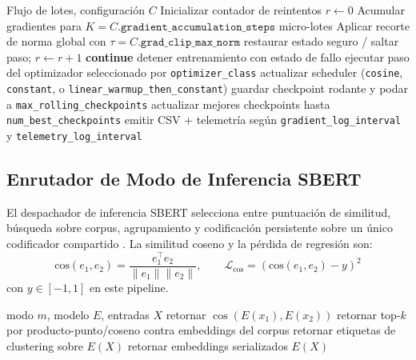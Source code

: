 \begin{algorithm}[t]
\caption{Paso de Entrenamiento Guiado por Esquema con Controles de Estabilidad}
\begin{algorithmic}[1]
\Require Flujo de lotes, configuración $C$
\State Inicializar contador de reintentos $r\gets 0$
    \State Acumular gradientes para $K=C.\texttt{gradient\_accumulation\_steps}$ micro-lotes
    \State Aplicar recorte de norma global con $\tau=C.\texttt{grad\_clip\_max\_norm}$
            \State restaurar estado seguro / saltar paso; $r \gets r+1$
            \State \textbf{continue}
        \Else
            \State detener entrenamiento con estado de fallo
        \EndIf
    \EndIf
    \State ejecutar paso del optimizador seleccionado por \texttt{optimizer\_class}
    \State actualizar scheduler (\texttt{cosine}, \texttt{constant}, o \texttt{linear\_warmup\_then\_constant})
        \State guardar checkpoint rodante y podar a \texttt{max\_rolling\_checkpoints}
    \EndIf
    \State actualizar mejores checkpoints hasta \texttt{num\_best\_checkpoints}
    \State emitir CSV + telemetría según \texttt{gradient\_log\_interval} y \texttt{telemetry\_log\_interval}
\EndFor
\end{algorithmic}
\end{algorithm}

\subsection{Enrutador de Modo de Inferencia SBERT}

El despachador de inferencia SBERT selecciona entre puntuación de similitud, búsqueda sobre corpus, agrupamiento y codificación persistente sobre un único codificador compartido \citep{reimers_sentence-bert_2019}. La similitud coseno y la pérdida de regresión son:
\[
\text{cos}(e_1,e_2)=\frac{e_1^\top e_2}{\|e_1\|\|e_2\|},\qquad
\mathcal{L}_{\text{cos}}=\left(\text{cos}(e_1,e_2)-y\right)^2
\]
con $y\in[-1,1]$ en este pipeline.

\begin{algorithm}[t]
\caption{Enrutador de Modo de Inferencia SBERT}
\begin{algorithmic}[1]
\Require modo $m$, modelo $E$, entradas $X$
    \State retornar $\cos(E(x_1),E(x_2))$
    \State retornar top-$k$ por producto-punto/coseno contra embeddings del corpus
    \State retornar etiquetas de clustering sobre $E(X)$
\Else
    \State retornar embeddings serializados $E(X)$
\EndIf
\end{algorithmic}
\end{algorithm}